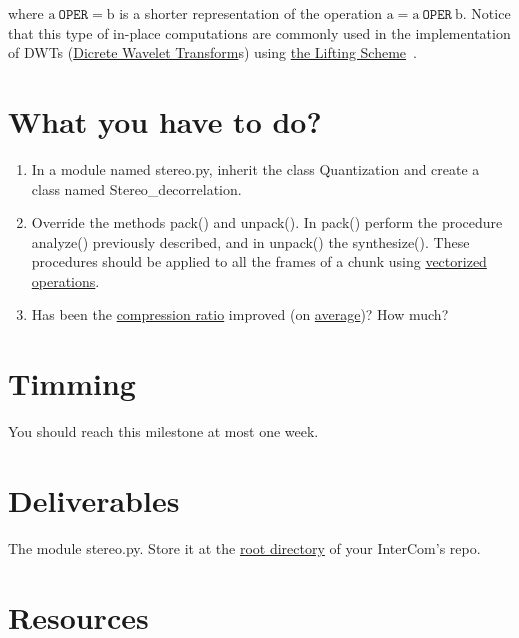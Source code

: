 where $\text{a}~\mathtt{OPER}= \text{b}$ is a shorter representation of the operation
$\text{a} = \text{a}~\mathtt{OPER}~\text{b}$. Notice that this type of in-place computations
are commonly used in the implementation of DWTs
(\href{https://en.wikipedia.org/wiki/Discrete_wavelet_transform}{Dicrete
  Wavelet Transform}s) using
\href{https://cm-bell-labs.github.io/who/wim/papers/athome/athome.pdf}{the
  Lifting Scheme}~\cite{2006.sweldens}.

\section{What you have to do?}

\begin{enumerate}
\item In a module named stereo.py, inherit the class
  Quantization and create a class named Stereo\_decorrelation.
\item Override the methods pack() and unpack(). In
  pack() perform the procedure analyze() previously
  described, and in unpack() the
  synthesize(). These procedures should be applied to
  all the frames of a chunk using \href{https://www.oreilly.com/library/view/python-for-data/9781449323592/ch04.html}{vectorized
    operations}.
\item Has been the
  \href{https://en.wikipedia.org/wiki/Data_compression_ratio}{compression
    ratio} improved (on
  \href{https://en.wikipedia.org/wiki/Average}{average})? How much?
\end{enumerate}

\section{Timming}

You should reach this milestone at most one week.

\section{Deliverables}

The module stereo.py. Store it at the
\href{https://github.com/Tecnologias-multimedia/intercom}{root
  directory} of your InterCom's repo.

\section{Resources}



